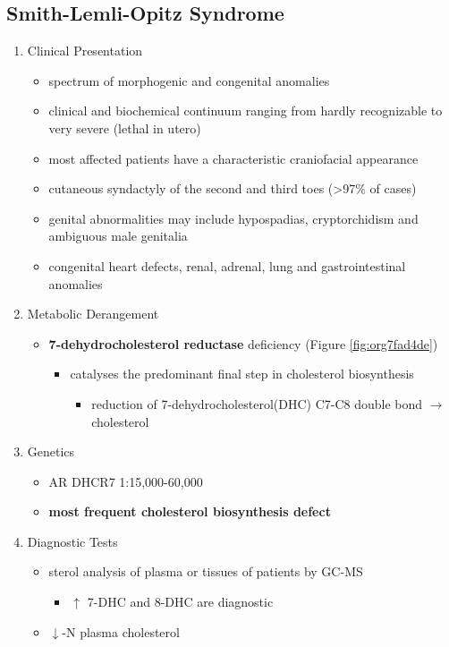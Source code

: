 \documentclass[12pt]{scrartcl}
\begin{document}
\subsection{Smith-Lemli-Opitz Syndrome}
\label{sec:orga02bb49}
\begin{enumerate}
\item Clinical Presentation
\label{sec:orgc58fcc7}
\begin{itemize}
\item spectrum of morphogenic and congenital anomalies
\item clinical and biochemical continuum ranging from hardly recognizable
to very severe (lethal in utero)
\item most affected patients have a characteristic craniofacial appearance
\item cutaneous syndactyly of the second and third toes (>97\% of cases)
\item genital abnormalities may include hypospadias, cryptorchidism and
ambiguous male genitalia
\item congenital heart defects, renal, adrenal, lung and gastrointestinal
anomalies
\end{itemize}

\item Metabolic Derangement
\label{sec:orgefdf883}
\begin{itemize}
\item \textbf{7-dehydrocholesterol reductase} deficiency (Figure \ref{fig:org7fad4de})
\begin{itemize}
\item catalyses the predominant final step in cholesterol biosynthesis
\begin{itemize}
\item reduction of 7-dehydrocholesterol(DHC) C7-C8 double bond \(\to\) cholesterol
\end{itemize}
\end{itemize}
\end{itemize}

\item Genetics
\label{sec:org97786dc}
\begin{itemize}
\item AR DHCR7 1:15,000-60,000
\item \textbf{most frequent cholesterol biosynthesis defect}
\end{itemize}

\item Diagnostic Tests
\label{sec:org45d3be8}
\begin{itemize}
\item sterol analysis of plasma or tissues of patients by GC-MS
\begin{itemize}
\item \(\uparrow\) 7-DHC and 8-DHC are diagnostic
\end{itemize}
\item \(\downarrow\)-N plasma cholesterol
\end{itemize}


\end{enumerate}
\end{document}

